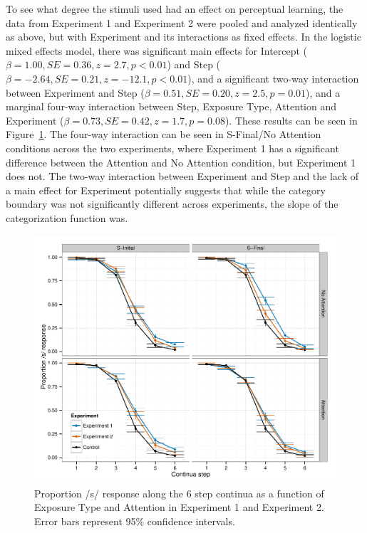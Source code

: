 To see what degree the stimuli used had an effect on perceptual learning, the data from Experiment 1 and Experiment 2 were pooled and analyzed identically as above, but with Experiment and its interactions as fixed effects.  In the logistic mixed effects model, there was significant main effects for Intercept ($\beta = 1.00, SE = 0.36, z = 2.7, p < 0.01$) and Step ($\beta = -2.64, SE = 0.21, z = -12.1, p < 0.01$), and a significant two-way interaction between Experiment and Step ($\beta = 0.51, SE = 0.20, z = 2.5, p = 0.01$), and a marginal four-way interaction between Step, Exposure Type, Attention and Experiment ($\beta = 0.73, SE = 0.42, z = 1.7, p = 0.08$).  These results can be seen in Figure~\ref{fig:exp12categ}.  The four-way interaction can be seen in S-Final/No Attention conditions across the two experiments, where Experiment 1 has a significant difference between the Attention and No Attention condition, but Experiment 1 does not.  The two-way interaction between Experiment and Step and the lack of a main effect for Experiment potentially suggests that while the category boundary was not significantly different across experiments, the slope of the categorization function was.

\begin{figure}[!ht]
\caption{Proportion /s/ response along the 6 step continua as a function of Exposure Type and Attention in Experiment 1 and Experiment 2. Error bars represent 95\% confidence intervals.}
\label{fig:exp12categ}
\begin{center}
\includegraphics[width=\textwidth]{graphs/exp12_categresults}
\end{center}
\end{figure}

